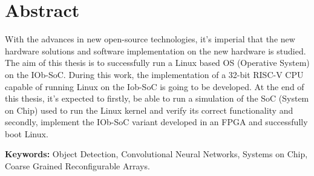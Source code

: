 
\section*{Abstract}



\quad With the advances in new open-source technologies, it's imperial that the new hardware solutions and software implementation on the new hardware is studied. The aim of this thesis is to successfully run a Linux based OS (Operative System) on the IOb-SoC. During this work, the implementation of a 32-bit RISC-V CPU capable of running Linux on the Iob-SoC is going to be developed. At the end of this thesis, it's expected to firstly, be able to run a simulation of the SoC (System on Chip) used to run the Linux kernel and verify its correct functionality and secondly, implement the IOb-SoC variant developed in an FPGA and successfully boot Linux.

\vfill

\textbf{\Large Keywords:} Object Detection, Convolutional Neural Networks,
Systems on Chip, Coarse Grained Reconfigurable Arrays.
